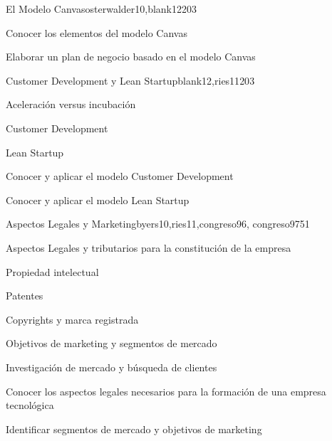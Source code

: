 \begin{syllabus}
\begin{unit}{El Modelo Canvas}{osterwalder10,blank12}{20}{3}
   \begin{learningoutcomes}
      \item Conocer los elementos del modelo Canvas
      \item Elaborar un plan de negocio basado en el modelo Canvas 
    \end{learningoutcomes}
\end{unit}

\begin{unit}{Customer Development y Lean Startup}{blank12,ries11}{20}{3}
	\begin{topics}
      \item Aceleración versus incubación  
      \item Customer Development
      \item Lean Startup 
   \end{topics}

   \begin{learningoutcomes}
      \item Conocer y aplicar el modelo Customer Development
      \item Conocer y aplicar el modelo Lean Startup
    \end{learningoutcomes}
\end{unit}

\begin{unit}{Aspectos Legales y Marketing}{byers10,ries11,congreso96, congreso97}{5}{1}
	\begin{topics}
	  \item Aspectos Legales y tributarios para la constitución de la empresa
      \item Propiedad intelectual
      \item Patentes
      \item Copyrights y marca registrada
      \item Objetivos de marketing  y segmentos de mercado
      \item Investigación de mercado y búsqueda de clientes
   \end{topics}

   \begin{learningoutcomes}
      \item Conocer los aspectos legales necesarios para la formación de una empresa tecnológica
      \item Identificar segmentos de mercado y objetivos de marketing    
   \end{learningoutcomes}
\end{unit}


\end{syllabus}
